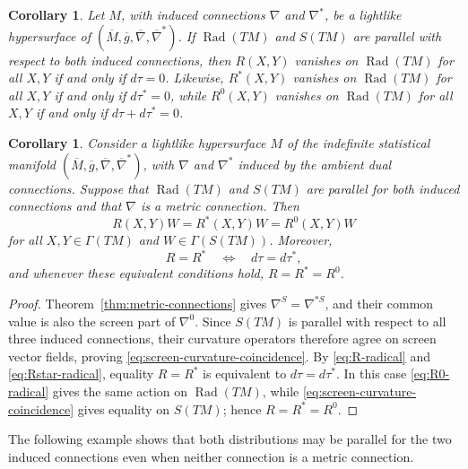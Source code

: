 \documentclass[11pt,a4paper]{article}
\newtheorem{corollary}[theorem]{Corollary}
\theoremstyle{remark}
\theoremstyle{definition}
\newcommand{\Rad}{\operatorname{Rad}}
\begin{document}
\begin{corollary}\label{cor:radical-curvature}
Let $M$, with induced connections $\nabla$ and $\nabla^{*}$, be a lightlike
hypersurface of
$(\overline{M},\overline{g},\overline{\nabla},\overline{\nabla}^{*})$.
If $\Rad(TM)$ and $S(TM)$ are parallel with respect to both induced
connections, then $R(X,Y)$ vanishes on $\Rad(TM)$ for all
$X,Y$ if and only if $d\tau=0$. Likewise, $R^{*}(X,Y)$ vanishes on
$\Rad(TM)$ for all $X,Y$ if and only if $d\tau^{*}=0$, while
$R^{0}(X,Y)$ vanishes on $\Rad(TM)$ for all $X,Y$ if and only if
$d\tau+d\tau^{*}=0$.
\end{corollary}

\begin{corollary}\label{cor:metric-curvature-coincidence}
Consider a lightlike hypersurface $M$ of the indefinite statistical manifold
$(\overline{M},\overline{g},\overline{\nabla},\overline{\nabla}^{*})$,
with $\nabla$ and $\nabla^{*}$ induced by the ambient dual connections.
Suppose that $\Rad(TM)$ and $S(TM)$ are parallel for both induced
connections and that $\nabla$ is a metric connection. Then
\begin{equation}\label{eq:screen-curvature-coincidence}
R(X,Y)W=R^{*}(X,Y)W=R^{0}(X,Y)W
\end{equation}
for all $X,Y\in\Gamma(TM)$ and $W\in\Gamma(S(TM))$. Moreover,
\begin{equation}\label{eq:full-curvature-coincidence}
R=R^{*}
\quad\Longleftrightarrow\quad
d\tau=d\tau^{*},
\end{equation}
and whenever these equivalent conditions hold,
$R=R^{*}=R^{0}$.
\end{corollary}

\begin{proof}
Theorem~\ref{thm:metric-connections} gives
$\nabla^{S}=\nabla^{*S}$, and their common value is also the screen part of
$\nabla^{0}$. Since $S(TM)$ is parallel with respect to all three induced
connections, their curvature operators therefore agree on screen vector
fields, proving \eqref{eq:screen-curvature-coincidence}. By
\eqref{eq:R-radical} and \eqref{eq:Rstar-radical}, equality $R=R^{*}$ is
equivalent to $d\tau=d\tau^{*}$. In this case
\eqref{eq:R0-radical} gives the same action on $\Rad(TM)$, while
\eqref{eq:screen-curvature-coincidence} gives equality on $S(TM)$; hence
$R=R^{*}=R^{0}$.
\end{proof}

The following example shows that both distributions may be parallel for the
two induced connections even when neither connection is a metric connection.
\end{document}
